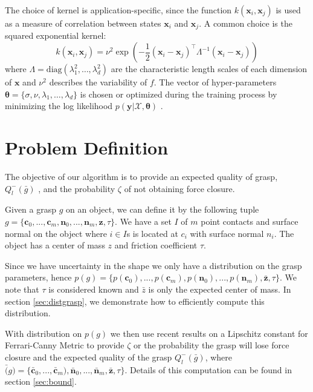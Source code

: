 \documentclass[letterpaper, 10 pt, conference]{ieeeconf}  %
\newcommand{\by}{\mathbf{y}}
\newcommand{\bx}{\mathbf{x}}
\newcommand{\mX}{\mathcal{X}}
\begin{document}
The choice of kernel is application-specific, since the function $k(\bx_i,\bx_j)$ is used as a measure of correlation between states $\bx_i$ and $\bx_j$.
A common choice is the squared exponential kernel:
\begin{equation}
k(\bx_i,\bx_j) 
=
\nu^2\exp(-\frac{1}{2}(\bx_i - \bx_j)^{\intercal}\Lambda^{-1}(\bx_i - \bx_j))
\end{equation}
where $\Lambda= \text{diag}(\lambda_1^2,\ldots,\lambda_d^2)$ are the characteristic length scales of each dimension of $\bx$ and $\nu^2$ describes the variability of $f$.
The vector of hyper-parameters $\boldsymbol{\theta} = \{\sigma,\nu,\lambda_1,\ldots,\lambda_d\}$ is chosen or optimized during the training process by minimizing the log likelihood $p(\by|\mX,\boldsymbol{\theta})$ \cite{rasmussen2006}.


\section{Problem Definition}

The objective of our algorithm is to provide an expected quality of grasp, $Q_l^-(\bar{g})$ \cite{ferrari1992}, and the probability $\zeta$ of not obtaining force closure. 

Given a grasp $g$ on an object, we can define it by the following tuple $g = \lbrace \textbf{c}_0,...,\textbf{c}_m,\textbf{n}_0,...,\textbf{n}_m,\textbf{z},\tau\rbrace$. We have a set $I$ of $m$  point contacts and surface normal on the object where $i \in I$s is located at $c_i$ with surface normal $n_i$. The object has a center of mass $z$ and friction coefficient $\tau$.

Since we have uncertainty in the shape we only have a distribution on the grasp parameters, hence $p(g) = \lbrace p(\textbf{c}_0),...,p(\textbf{c}_m),p(\textbf{n}_0),...,p(\textbf{n}_m),\bar{\textbf{z}},\tau \rbrace$. We note that $\tau$ is considered known and $\bar{z}$ is only the expected center of mass. In section \ref{sec:distgrasp}, we demonstrate how to efficiently compute this distribution. 

With distribution on $p(g)$ we then use recent results on a Lipschitz constant for Ferrari-Canny Metric \cite{pokorny2013classical} to provide $\zeta$ or the probability the grasp will lose force closure and the expected quality of the grasp $Q_l^-(\bar{g})$, where $\bar(g) = \lbrace \bar{\textbf{c}}_0,...,\bar{\textbf{c}}_m),\bar{\textbf{n}}_0,...,\bar{\textbf{n}}_m,\bar{\textbf{z}},\tau \rbrace$. Details of this computation can be found in section \ref{sec:bound}.
\end{document}
